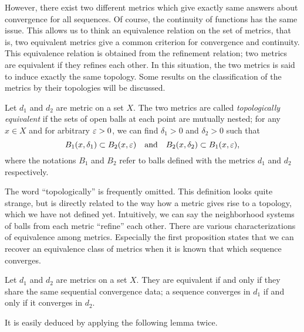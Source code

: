 However, there exist two different metrics which give exactly same answers about convergence for all sequences.
Of course, the continuity of functions has the same issue.
This allows us to think an equivalence relation on the set of metrics, that is, two equivalent metrics give a common criterion for convergence and continuity.
This equivalence relation is obtained from the refinement relation; two metrics are equivalent if they refines each other.
In this situation, the two metrics is said to induce exactly the same topology.
Some results on the classification of the metrics by their topologies will be discussed.


\begin{defn}
Let $d_1$ and $d_2$ are metric on a set $X$.
The two metrics are called \emph{topologically equivalent} if the sets of open balls at each point are mutually nested;
for any $x\in X$ and for arbitrary $\varepsilon>0$, we can find $\delta_1>0$ and $\delta_2>0$ such that
\[B_1(x,\delta_1)\subset B_2(x,\varepsilon)\quad\text{and}\quad B_2(x,\delta_2)\subset B_1(x,\varepsilon),\]
where the notations $B_1$ and $B_2$ refer to balls defined with the metrics $d_1$ and $d_2$ respectively.
\end{defn}

The word ``topologically'' is frequently omitted.
This definition looks quite strange, but is directly related to the way how a metric gives rise to a topology, which we have not defined yet.
Intuitively, we can say the neighborhood systems of balls from each metric ``refine'' each other.
There are various characterizations of equivalence among metrics.
Especially the first proposition states that we can recover an equivalence class of metrics when it is known that which sequence converges.

\begin{prop}\label{prop:sequential convergence data}
Let $d_1$ and $d_2$ are metrics on a set $X$.
They are equivalent if and only if they share the same sequential convergence data; a sequence converges in $d_1$ if and only if it converges in $d_2$.
\end{prop}
\begin{pf}
It is easily deduced by applying the following lemma twice.
\end{pf}

